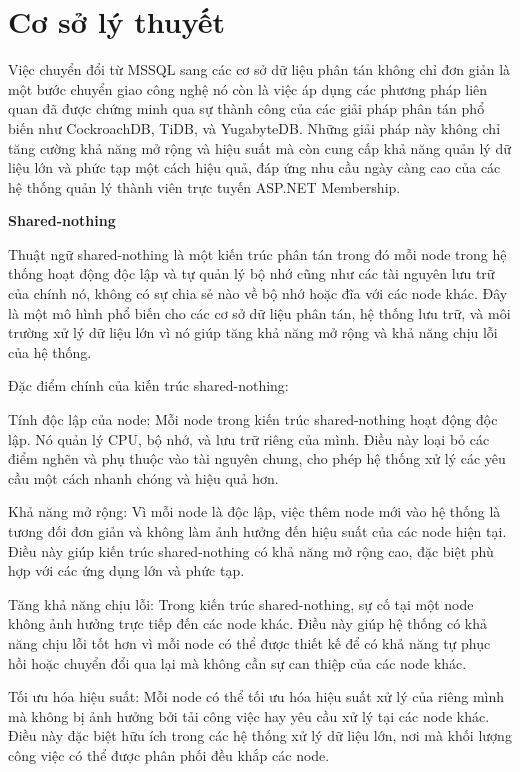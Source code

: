 \documentclass{article}[14pt]
\begin{document}
\section{Cơ sở lý thuyết}

Việc chuyển đổi từ MSSQL sang các cơ sở dữ liệu phân tán không chỉ đơn giản là một bước chuyển giao công nghệ nó còn là việc áp dụng các phương pháp liên quan đã được chứng minh qua sự thành công của các giải pháp phân tán phổ biến như CockroachDB, TiDB, và YugabyteDB. Những giải pháp này không chỉ tăng cường khả năng mở rộng và hiệu suất mà còn cung cấp khả năng quản lý dữ liệu lớn và phức tạp một cách hiệu quả, đáp ứng nhu cầu ngày càng cao của các hệ thống quản lý thành viên trực tuyến ASP.NET Membership.

\textbf{Shared-nothing}

Thuật ngữ shared-nothing \cite{article} là một kiến trúc phân tán trong đó mỗi node trong hệ thống hoạt động độc lập và tự quản lý bộ nhớ cũng như các tài nguyên lưu trữ của chính nó, không có sự chia sẻ nào về bộ nhớ hoặc đĩa với các node khác. Đây là một mô hình phổ biến cho các cơ sở dữ liệu phân tán, hệ thống lưu trữ, và môi trường xử lý dữ liệu lớn vì nó giúp tăng khả năng mở rộng và khả năng chịu lỗi của hệ thống.


Đặc điểm chính của kiến trúc shared-nothing:

Tính độc lập của node: Mỗi node trong kiến trúc shared-nothing hoạt động độc lập. Nó quản lý CPU, bộ nhớ, và lưu trữ riêng của mình. Điều này loại bỏ các điểm nghẽn và phụ thuộc vào tài nguyên chung, cho phép hệ thống xử lý các yêu cầu một cách nhanh chóng và hiệu quả hơn.

Khả năng mở rộng: Vì mỗi node là độc lập, việc thêm node mới vào hệ thống là tương đối đơn giản và không làm ảnh hưởng đến hiệu suất của các node hiện tại. Điều này giúp kiến trúc shared-nothing có khả năng mở rộng cao, đặc biệt phù hợp với các ứng dụng lớn và phức tạp.

Tăng khả năng chịu lỗi: Trong kiến trúc shared-nothing, sự cố tại một node không ảnh hưởng trực tiếp đến các node khác. Điều này giúp hệ thống có khả năng chịu lỗi tốt hơn vì mỗi node có thể được thiết kế để có khả năng tự phục hồi hoặc chuyển đổi qua lại mà không cần sự can thiệp của các node khác.

Tối ưu hóa hiệu suất: Mỗi node có thể tối ưu hóa hiệu suất xử lý của riêng mình mà không bị ảnh hưởng bởi tải công việc hay yêu cầu xử lý tại các node khác. Điều này đặc biệt hữu ích trong các hệ thống xử lý dữ liệu lớn, nơi mà khối lượng công việc có thể được phân phối đều khắp các node.
\end{document}
